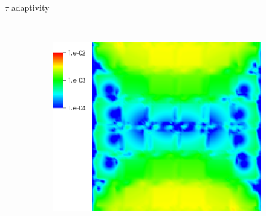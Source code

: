 \documentclass{beamer}
\begin{document}
\begin{frame}{$\tau$ adaptivity}
\begin{figure}
\begin{subfigure}[b]{0.28\textwidth}
  \end{subfigure} ~
  \begin{subfigure}[b]{0.28\textwidth}
    \includegraphics[width=\textwidth]{figures/MG/ElasticityCompressErrorTauTrim}
  \end{subfigure}
\end{figure}
\end{frame}

\end{document}
